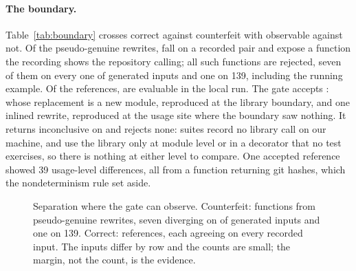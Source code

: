 \documentclass[11pt]{article}
\begin{document}
\paragraph{The boundary.}
Table~\ref{tab:boundary} crosses correct against counterfeit with observable against not.
Of the \nPseudo{} pseudo-genuine rewrites, \nPseudoTraced{} fall on a recorded pair and \nPseudoEvaluable{} expose a function the recording shows the repository calling; all \nPseudoFunctions{} such functions are rejected, seven of them on every one of \nFuzzInputs{} generated inputs and one on 139, including the running example.
Of the \nRefs{} references, \nRefsEvaluable{} are evaluable in the local run.
The gate accepts \nRefsAccepted: \nRefsNewModuleAccepted{} whose replacement is a new module, reproduced at the library boundary, and one inlined rewrite, reproduced at the usage site where the boundary saw nothing.
It returns inconclusive on \nRefsInconclusive{} and rejects none: \nRefsNoCalls{} suites record no library call on our machine, and \nRefsNotObservable{} use the library only at module level or in a decorator that no test exercises, so there is nothing at either level to compare.
One accepted reference showed 39 usage-level differences, all from a function returning git hashes, which the nondeterminism rule set aside.

\begin{figure}[t]
\centering
{}
\caption{Separation where the gate can observe. Counterfeit: \nPseudoFunctions{} functions from \nPseudoEvaluable{} pseudo-genuine rewrites, seven diverging on \nFuzzInputs{} of \nFuzzInputs{} generated inputs and one on 139. Correct: \nRefsAccepted{} references, each agreeing on every recorded input. The inputs differ by row and the counts are small; the margin, not the count, is the evidence.}
\label{fig:separation}
\end{figure}
\end{document}

